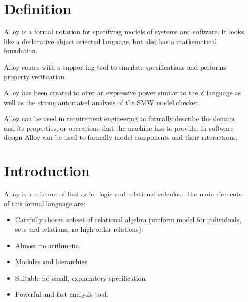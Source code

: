 \documentclass[12pt, a4paper]{report}
\newtheorem[style=M,bodystyle=\normalfont]{theorem}{Theorem}
\newtheorem[style=M,bodystyle=\normalfont]{corollary}{Corollary}
\newtheorem[style=M,bodystyle=\normalfont]{lemma}{Lemma}
\newtheorem[style=M,bodystyle=\normalfont]{definition}{Definition}
\begin{document}
\section{Definition}
    Alloy is a formal notation for specifying models of systems and software. It looks like a declarative object oriented language, but also has a mathematical foundation.
    \par
    Alloy comes with a supporting tool to simulate specifications and performs property verification.
    \par
    Alloy has been created to offer an expressive power similar to the Z language as well as the strong automated analysis of the SMW model checker. 
    \par
    Alloy can be used in requirement engineering  to formally describe the domain and its properties, or operations that the machine has to provide. In software design Alloy can be used to formally model components and their interactions. 
\section{Introduction}
    Alloy is a mixture of first order logic and relational calculus. The main elements of this formal language are: 
    \begin{itemize}
        \item Carefully chosen subset of relational algebra (uniform model for individuals, sets and relations; no high-order relations).
        \item Almost no arithmetic.
        \item Modules and hierarchies.
        \item Suitable for small, explanatory specification.
        \item Powerful and fast analysis tool.
    \end{itemize}
\end{document}
